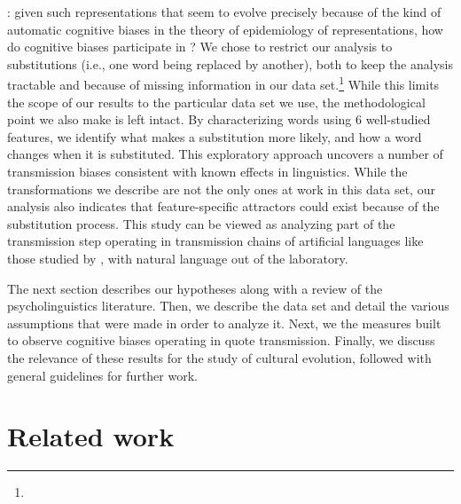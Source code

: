\begin{new}
: given such representations that seem to evolve precisely because of the kind of automatic cognitive biases  in the theory of epidemiology of representations, %
how do cognitive biases participate in ?
We chose to restrict our analysis to substitutions (i.e., one word being replaced by another), both to keep the analysis tractable and because of missing information in our data set.\footnote{
}
While this limits the scope of our results to the particular data set we use, the methodological point we also make is left intact.  By characterizing words using 6 well-studied features, we identify what makes a substitution more likely, and how a word changes when it is substituted.
This exploratory approach uncovers a number of transmission biases consistent with known effects in linguistics.
While the transformations we describe are not the only ones at work in this data set, our analysis also indicates that feature-specific attractors could exist because of the substitution process.
This study can be viewed as analyzing part of the transmission step operating in transmission chains of artificial languages like those studied by \citet{kirby_cumulative_2008},  with natural language out of the laboratory.

The next section %
describes our hypotheses along with a review of the psycholinguistics literature.
Then, we describe the data set and detail the various assumptions that were made in order to analyze it.
Next, we  the measures  built to observe  cognitive biases operating in quote transmission. Finally, we discuss the relevance of these results for the study of cultural evolution, followed with general guidelines for further work.%
\end{new}


\section{Related work} %
\label{sec:related}

